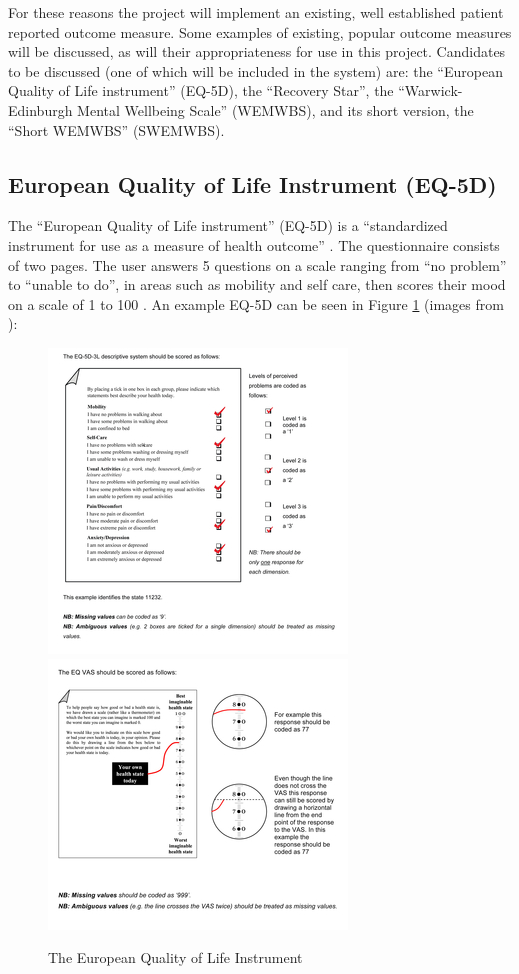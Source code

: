 \documentclass[11pt,openright,a4paper]{report}
\begin{document}
For these reasons the project will implement an existing, well established patient reported outcome measure. Some examples of existing, popular outcome measures will be discussed, as will their appropriateness for use in this project. Candidates to be discussed (one of which will be included in the system) are: the \enquote{European Quality of Life instrument} (EQ-5D), the \enquote{Recovery Star}, the \enquote{Warwick-Edinburgh Mental Wellbeing Scale} (WEMWBS), and its short version, the \enquote{Short WEMWBS} (SWEMWBS).

\newpage
\subsection{European Quality of Life Instrument (EQ-5D)}
The \enquote{European Quality of Life instrument} (EQ-5D) is a \enquote{standardized instrument for use as a measure of health outcome} \parencite{eq5dabout}. The questionnaire consists of two pages. The user answers 5 questions on a scale ranging from \enquote{no problem} to \enquote{unable to do}, in areas such as mobility and self care, then scores their mood on a scale of 1 to 100 \parencite{eq5duse}. An example EQ-5D can be seen in Figure \ref{fig:eq5d} (images from \parencite{eq5duse}):

\begin{figure}[ht]
\caption{The European Quality of Life Instrument}
\includegraphics[width=.5\textwidth]{i/eq5d1.jpg}\hfill
\includegraphics[width=.5\textwidth]{i/eq5d2.jpg}
\label{fig:eq5d}
\end{figure}
\end{document}
